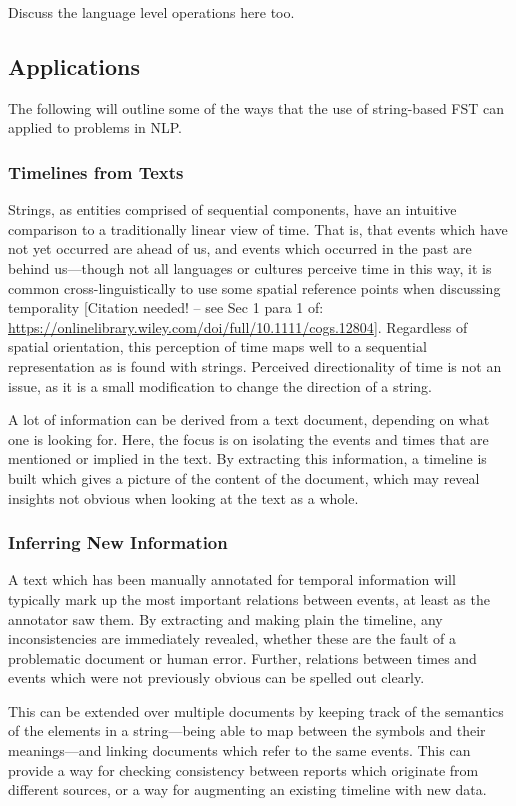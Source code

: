 \documentclass[a4paper,12pt,leqno]{article}
\newcommand{\citeneeded}[1][]{{\color{red}[Citation needed!#1]}}
\begin{document}
Discuss the language level operations here too.

\subsection{Applications}\label{sub:applications}
The following will outline some of the ways that the use of string-based FST can applied to problems in NLP.

\subsubsection{Timelines from Texts}\label{ssub:timelines}
Strings, as entities comprised of sequential components, have an intuitive comparison to a traditionally linear view of time. That is, that events which have not yet occurred are ahead of us, and events which occurred in the past are behind us---though not all languages or cultures perceive time in this way, it is common cross-linguistically to use some spatial reference points when discussing temporality \citeneeded[ -- see Sec 1 para 1 of: \url{https://onlinelibrary.wiley.com/doi/full/10.1111/cogs.12804}]{}. Regardless of spatial orientation, this perception of time maps well to a sequential representation as is found with strings. Perceived directionality of time is not an issue, as it is a small modification to change the direction of a string.

A lot of information can be derived from a text document, depending on what one is looking for. Here, the focus is on isolating the events and times that are mentioned or implied in the text. By extracting this information, a timeline is built which gives a picture of the content of the document, which may reveal insights not obvious when looking at the text as a whole.

\subsubsection{Inferring New Information}\label{ssub:inferring}
A text which has been manually annotated for temporal information will typically mark up the most important relations between events, at least as the annotator saw them. By extracting and making plain the timeline, any inconsistencies are immediately revealed, whether these are the fault of a problematic document or human error. Further, relations between times and events which were not previously obvious can be spelled out clearly.

This can be extended over multiple documents by keeping track of the semantics of the elements in a string---being able to map between the symbols and their meanings---and linking documents which refer to the same events. This can provide a way for checking consistency between reports which originate from different sources, or a way for augmenting an existing timeline with new data.
\end{document}
